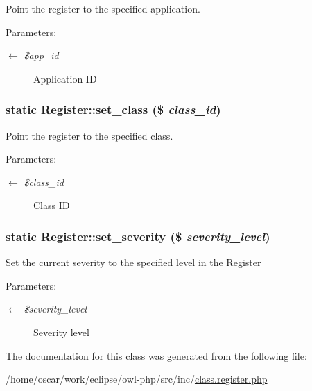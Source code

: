 Point the register to the specified application.

\begin{Desc}
\item[Parameters:]
\begin{description}
\item[\mbox{$\leftarrow$} {\em \$app\_\-id}]Application ID \end{description}
\end{Desc}
\hypertarget{classRegister_58e49ccb1fe4e441d0329e879c922aa0}{
\subsubsection{\setlength{\rightskip}{0pt plus 5cm}static Register::set\_\-class (\$ {\em class\_\-id})}}
\label{classRegister_58e49ccb1fe4e441d0329e879c922aa0}


Point the register to the specified class.

\begin{Desc}
\item[Parameters:]
\begin{description}
\item[\mbox{$\leftarrow$} {\em \$class\_\-id}]Class ID \end{description}
\end{Desc}
\hypertarget{classRegister_0adde8d67d77b9b4d66156272cb48ae4}{
\subsubsection{\setlength{\rightskip}{0pt plus 5cm}static Register::set\_\-severity (\$ {\em severity\_\-level})}}
\label{classRegister_0adde8d67d77b9b4d66156272cb48ae4}


Set the current severity to the specified level in the \hyperlink{classRegister}{Register}

\begin{Desc}
\item[Parameters:]
\begin{description}
\item[\mbox{$\leftarrow$} {\em \$severity\_\-level}]Severity level \end{description}
\end{Desc}


The documentation for this class was generated from the following file:\begin{CompactItemize}
\item 
/home/oscar/work/eclipse/owl-php/src/inc/\hyperlink{class_8register_8php}{class.register.php}\end{CompactItemize}
